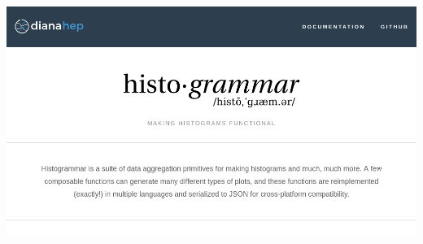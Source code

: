 \documentclass[aspectratio=169]{beamer}
\begin{document}






\begin{frame}{}
\hspace{-1 cm}\mbox{\includegraphics[width=16 cm]{frontpage.png}\hspace{-5 cm}}
\end{frame}
\end{document}
